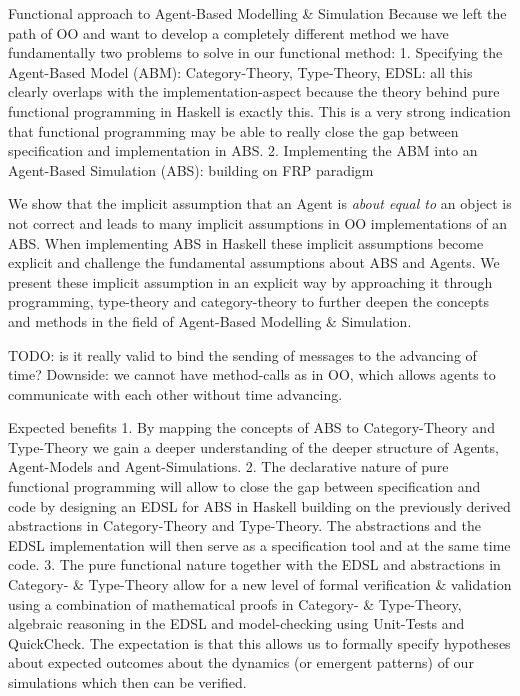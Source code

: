 Functional approach to Agent-Based Modelling \& Simulation
Because we left the path of OO and want to develop a completely different method we have fundamentally two problems to solve in our functional method:
1. Specifying the Agent-Based Model (ABM): Category-Theory, Type-Theory, EDSL: all this clearly overlaps with the  implementation-aspect because the theory behind pure functional programming in Haskell is exactly this. This is a very strong indication that functional programming may be able to really close the gap between specification and implementation in ABS.
2. Implementing the ABM into an Agent-Based Simulation (ABS): building on FRP paradigm

We show that the implicit assumption that an Agent is \textit{about equal to} an object is not correct and leads to many implicit assumptions in OO implementations of an ABS. When implementing ABS in Haskell these implicit assumptions become explicit and challenge the fundamental assumptions about ABS and Agents. We present these implicit assumption in an explicit way by approaching it through programming, type-theory and category-theory to further deepen the concepts and methods in the field of Agent-Based Modelling \& Simulation.

TODO: is it really valid to bind the sending of messages to the advancing of time?
Downside: we cannot have method-calls as in OO, which allows agents to communicate with each other without time advancing. 

Expected benefits
1. By mapping the concepts of ABS to Category-Theory and Type-Theory we gain a deeper understanding of the deeper structure of Agents, Agent-Models and Agent-Simulations.
2. The declarative nature of pure functional programming will allow to close the gap between specification and code by designing an EDSL for ABS in Haskell building on the previously derived abstractions in Category-Theory and Type-Theory. The abstractions and the EDSL implementation will then serve as a specification tool and at the same time code.
3. The pure functional nature together with the EDSL and abstractions in Category- \& Type-Theory allow for a new level of formal verification \& validation using a combination of mathematical proofs in Category- \& Type-Theory, algebraic reasoning in the EDSL and model-checking using Unit-Tests and QuickCheck. The expectation is that this allows us to formally specify hypotheses about expected outcomes about the dynamics (or emergent patterns) of our simulations which then can be verified.
	
